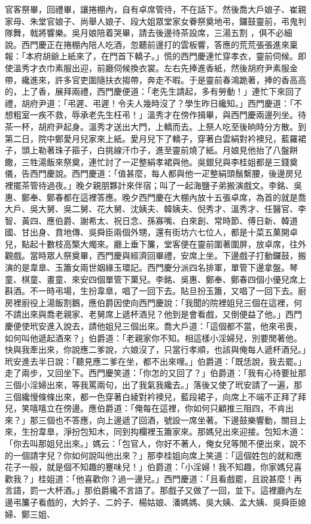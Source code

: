 \begin{showcontents}{}
官客祭畢，回禮畢，讓捲棚內，自有卓席管待，不在話下。然後喬大戶娘子、崔親家母、朱堂官娘子、尚舉人娘子、段大姐眾堂家女眷祭奠地弔，鑼鼓靈前，弔鬼判隊舞，戟將響樂。吳月娘陪着哭畢，請去後邊待茶設席，三湯五割 ，俱不必細說。西門慶正在捲棚內陪人吃酒，忽聽前邊打的雲板響，答應的荒荒張張進來稟報：「本府胡爺上紙來了，在門首下轎子。」慌的西門慶連忙穿孝衣，靈前伺候。即使溫秀才衣巾素服出迎，前廳伺候換衣裳。左右先捧進香紙，然後胡府尹素服金帶，纔進來，許多官吏圍隨扶衣搊帶，奔走不暇。于是靈前春鴻跪著，捧的香高高的，上了香，展拜兩禮，西門慶便道：「老先生請起，多有勞動！」連忙下來回了禮，胡府尹道：「弔遲、弔遲！令夫人幾時沒了？學生昨日纔知。」西門慶道：「不想粗室一疾不救，辱承老先生枉弔！」溫秀才在傍作揖畢，與西門慶兩邊列坐。待茶一杯，胡府尹起身。溫秀才送出大門，上轎而去。上祭人吃至後晌時分方散。到第二日，院中鄭愛月兒家來上紙。愛月兒下了轎子，穿著白雲絹對衿襖兒，藍羅裙子，頭上勒著珠子箍子，白挑線汗巾子，進至靈前燒了紙。月娘見他抬了八盤餅饊，三牲湯飯來祭奠，連忙討了一疋整絹孝裙與他。吳銀兒與李桂姐都是三錢奠儀，告西門慶說。西門慶道：「值甚麼，每人都與他一疋整絹頭鬚繫腰，後邊房兒裡擺茶管待過夜。」晚夕親朋夥計來伴宿；叫了一起海鹽子弟搬演戲文。李銘、吳惠、鄭奉、鄭春都在這裡答應。晚夕西門慶在大棚內放十五張卓席，為首的就是喬大戶、吳大舅、吳二舅、花大舅、沈姨夫、韓姨夫、倪秀才、溫秀才、任醫官、李智、黃四、應伯爵、謝希太、祝日念、孫寡嘴、白來創、常時節、傅日新、韓道國、甘出身、賁地傳、吳舜臣兩個外甥，還有街坊六七位人，都是十菜五菓開卓兒，點起十數枝高檠大燭來。廳上垂下簾，堂客便在靈前圍著圍屏，放卓席，往外觀戲。當時眾人祭奠畢，西門慶與經濟回畢禮，安席上坐。下邊戲子打動鑼鼓，搬演的是韋臯、玉簫女兩世姻緣玉環記。西門慶分派四名排軍，單管下邊拿盤。琴童、棋童、畫童、來安四個單管下菓兒。李銘、吳惠、鄭奉、鄭春四個小優兒席上斟酒。不一時弔場，生扮韋臯，唱了一回下去。貼旦扮玉簫，又唱了一回下去。廚房裡廚役上湯飯割鵝，應伯爵因使向西門慶說：「我聞的院裡姐兒三個在這裡，何不請出來與喬老親家、老舅席上遞杯酒兒？他到是會看戲，又倒便益了他。」西門慶便使玳安進入說去，請他姐兒三個出來。喬大戶道：「這個都不當，他來弔喪，如何叫他遞起酒來？」伯爵道：「老親家你不知。相這樣小淫婦兒，別要閒著他。快與我牽出來，你說應二爹說，六娘沒了，只當行孝順，也該與俺每人遞杯酒兒。」玳安進去半日說：「聽見應二爹在坐，都不出來哩。」伯爵道：「既恁說，我去罷。」走了兩步，又回坐下。西門慶笑道：「你怎的又回了？」伯爵道：「我有心待要扯那三個小淫婦出來，等我罵兩句，出了我氣我纔去。」落後又使了玳安請了一遍，那三個纔慢條條出來，都一色穿著白綾對衿襖兒，藍段裙子，向席上不端不正拜了拜兒，笑嘻嘻立在傍邊。應伯爵道：「俺每在這裡，你如何只顧推三阻四，不肯出來？」那三個也不答應，向上邊遞了回酒，號設一席坐著。下邊鼓樂響動，關目上來，生扮韋臯，淨扮包知木，同到抅欄裡玉簫家來。那媽兒出來迎接。包知木道：「你去叫那姐兒出來。」媽云：「包官人，你好不著人，俺女兒等閒不便出來，說不的一個請字兒？你如何說叫他出來？」那李桂姐向席上笑道：「這個姓包的就和應花子一般，就是個不知趣的蹇味兒！」伯爵道：「小淫婦！我不知趣，你家媽兒喜歡我？」桂姐道：「他喜歡你？過一邊兒。」西門慶道：「且看戲罷，且說甚麼！再言語，罰一大杯酒。」那伯爵纔不言語了。那戲子又做了一回，並下。這裡廳內左邊弔簾子看戲的，大妗子、二妗子、楊姑娘、潘媽媽、吳大姨、孟大姨、吳舜臣媳婦、鄭三姐、
\end{showcontents}
